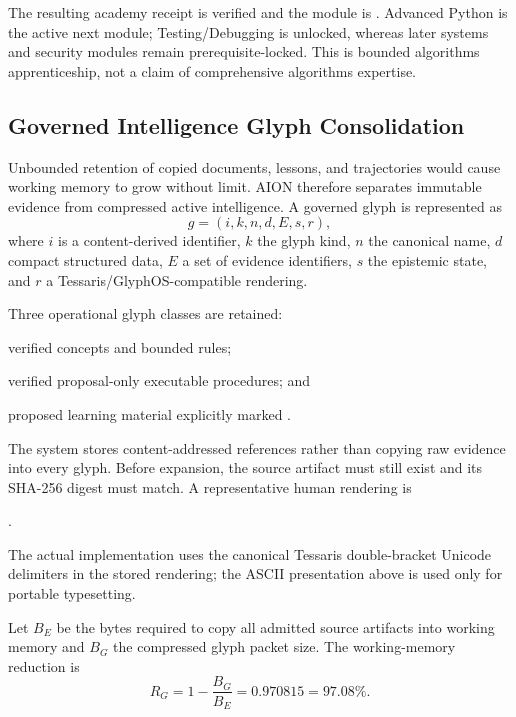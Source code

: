 The resulting academy receipt is verified and the module is
.  Advanced Python is the active next module;
Testing/Debugging is unlocked, whereas later systems and security modules remain
prerequisite-locked.  This is bounded algorithms apprenticeship, not a claim of
comprehensive algorithms expertise.

\subsection{Governed Intelligence Glyph Consolidation}
\label{subsec:governed-intelligence-glyphs}

Unbounded retention of copied documents, lessons, and trajectories would cause
working memory to grow without limit.  AION therefore separates immutable
evidence from compressed active intelligence.  A governed glyph is represented
as
\begin{equation}
g=(i,k,n,d,E,s,r),
\label{eq:intelligence-glyph-structure}
\end{equation}
where $i$ is a content-derived identifier, $k$ the glyph kind, $n$ the canonical
name, $d$ compact structured data, $E$ a set of evidence identifiers, $s$ the
epistemic state, and $r$ a Tessaris/GlyphOS-compatible rendering.

Three operational glyph classes are retained:
\begin{description}[leftmargin=2.4cm,style=nextline]
    \item[Knowledge] verified concepts and bounded rules;
    \item[Skill] verified proposal-only executable procedures; and
    \item[Curriculum] proposed learning material explicitly marked
          .
\end{description}
The system stores content-addressed references rather than copying raw evidence
into every glyph.  Before expansion, the source artifact must still exist and
its SHA-256 digest must match.  A representative human rendering is
\begin{center}
\small
{}.
\end{center}
The actual implementation uses the canonical Tessaris double-bracket Unicode
delimiters in the stored rendering; the ASCII presentation above is used only
for portable typesetting.

Let $B_E$ be the bytes required to copy all admitted source artifacts into
working memory and $B_G$ the compressed glyph packet size.  The working-memory
reduction is
\begin{equation}
R_G=1-\frac{B_G}{B_E}=0.970815=97.08\%.
\label{eq:glyph-compression-ratio}
\end{equation}

